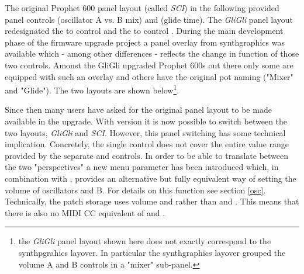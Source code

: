 The original Prophet 600 panel layout (called \textit{SCI}) in the following provided panel controls \mixer (oscillator A vs. B mix) and \glidepot (glide time). The \textit{GliGli} panel layout redesignated the \mixer to control \vola and the \glidepot to control \volb. During the main development phase of the firmware upgrade project a panel overlay from synthgraphics\cite{synthgraphics} was available which - among other differences - reflects the change in function of those two controls. Amonst the GliGli upgraded Prophet 600s out there only some are equipped with such an overlay and others have the original pot naming ("Mixer" and "Glide"). The two layouts are shown below\footnote{the \textit{GliGli} panel layout shown here does not exactly correspond to the synthpgrahics layover. In particular the synthgraphics layover grouped the volume A and B controls in a "mixer" sub-panel.}. 


Since then many users have asked for the original panel layout to be made available in the upgrade. With version \version it is now possible to switch between the two layouts, \textit{GliGli} and \textit{SCI}. However, this panel switching has some technical implication. Concretely, the single \mixer control does not cover the entire value range provided by the separate \vola and \volb controls. In order to be able to translate between the two "perspectives" a new menu parameter \drive has been introduced which, in combination with \mixer, provides an alternative but fully equivalent way of setting the volume of oscillators and B. For details on this function see section \ref{osc}. Technically, the patch storage uses volume \vola and \volb rather than \mixer and \drive. This means that there is also no MIDI CC equivalent of \mixer and \drive.

